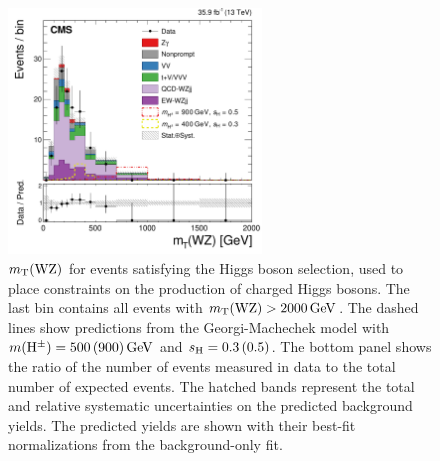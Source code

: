 \begin{figure}[htbp]
  \centering
    \includegraphics[width=0.6\textwidth]{figures/AnalysisResults/MTWZ_Higgs.pdf}
  \caption{
      $m_{\mathrm{T}}(\mathrm{W}\mathrm{Z})$ for events satisfying the Higgs boson selection,
      used to place constraints on the production of charged Higgs bosons.
      The last bin contains all events with $m_{\mathrm{T}}(\mathrm{W}\mathrm{Z}) > 2000\,\text{Ge\hspace{-.08em}V}$.
      The dashed lines show predictions from the Georgi-Machechek model with
      $m(\mathrm{H}^{\pm}) = 500 \,(900)\,\text{Ge\hspace{-.08em}V}$ and $s_{\mathrm{H}} = 0.3 \,(0.5)$.
      The bottom panel shows the ratio of the number of events measured in data to the total 
      number of expected events. The hatched bands represent the total and relative 
      systematic uncertainties on the predicted background yields.
      The predicted yields are shown with their best-fit normalizations from the background-only fit.
      }
 \label{fig:higgsmt}
\end{figure}

